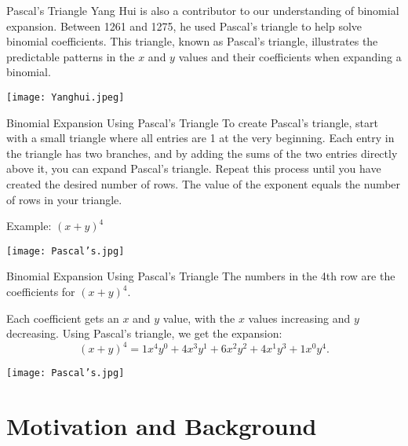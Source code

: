 \documentclass{beamer}
\theoremstyle{plain}
\theoremstyle{definition}
\theoremstyle{remark}
\begin{document}
\begin{frame}{Pascal's Triangle}
Yang Hui is also a contributor to our understanding of binomial expansion. Between 1261 and 1275, he used Pascal's triangle to help solve binomial coefficients. This triangle, known as Pascal’s triangle, illustrates the predictable patterns in the \(x\) and \(y\) values and their coefficients when expanding a binomial.

\begin{center}
    \texttt{[image: Yanghui.jpeg]}
\end{center}
\end{frame}

\begin{frame}{Binomial Expansion Using Pascal's Triangle}
To create Pascal's triangle, start with a small triangle where all entries are 1 at the very beginning. Each entry in the triangle has two branches, and by adding the sums of the two entries directly above it, you can expand Pascal's triangle. Repeat this process until you have created the desired number of rows. The value of the exponent equals the number of rows in your triangle.

\vspace{0.2cm}
Example: \((x+y)^4\)

\begin{center}
    \texttt{[image: Pascal's.jpg]}
\end{center}
\end{frame}

\begin{frame}{Binomial Expansion Using Pascal's Triangle}
The numbers in the 4th row are the coefficients for \((x+y)^4\).

\vspace{0.2cm}
Each coefficient gets an \(x\) and \(y\) value, with the \(x\) values increasing and \(y\) decreasing.  
Using Pascal's triangle, we get the expansion:
$$(x+y)^4 = 1x^4y^0 + 4x^3y^1 + 6x^2y^2 + 4x^1y^3 + 1x^0y^4.$$

\begin{center}
    \texttt{[image: Pascal's.jpg]}
\end{center}
\end{frame}

\section{Motivation and Background}
\end{document}
